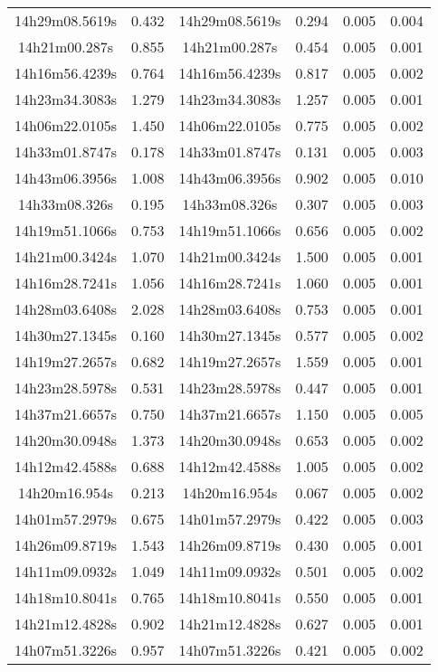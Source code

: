 \begin{table}
\begin{tabular}{cccccc}
14h29m08.5619s & 0.432 & 14h29m08.5619s & 0.294 & 0.005 & 0.004 \\
14h21m00.287s & 0.855 & 14h21m00.287s & 0.454 & 0.005 & 0.001 \\
14h16m56.4239s & 0.764 & 14h16m56.4239s & 0.817 & 0.005 & 0.002 \\
14h23m34.3083s & 1.279 & 14h23m34.3083s & 1.257 & 0.005 & 0.001 \\
14h06m22.0105s & 1.450 & 14h06m22.0105s & 0.775 & 0.005 & 0.002 \\
14h33m01.8747s & 0.178 & 14h33m01.8747s & 0.131 & 0.005 & 0.003 \\
14h43m06.3956s & 1.008 & 14h43m06.3956s & 0.902 & 0.005 & 0.010 \\
14h33m08.326s & 0.195 & 14h33m08.326s & 0.307 & 0.005 & 0.003 \\
14h19m51.1066s & 0.753 & 14h19m51.1066s & 0.656 & 0.005 & 0.002 \\
14h21m00.3424s & 1.070 & 14h21m00.3424s & 1.500 & 0.005 & 0.001 \\
14h16m28.7241s & 1.056 & 14h16m28.7241s & 1.060 & 0.005 & 0.001 \\
14h28m03.6408s & 2.028 & 14h28m03.6408s & 0.753 & 0.005 & 0.001 \\
14h30m27.1345s & 0.160 & 14h30m27.1345s & 0.577 & 0.005 & 0.002 \\
14h19m27.2657s & 0.682 & 14h19m27.2657s & 1.559 & 0.005 & 0.001 \\
14h23m28.5978s & 0.531 & 14h23m28.5978s & 0.447 & 0.005 & 0.001 \\
14h37m21.6657s & 0.750 & 14h37m21.6657s & 1.150 & 0.005 & 0.005 \\
14h20m30.0948s & 1.373 & 14h20m30.0948s & 0.653 & 0.005 & 0.002 \\
14h12m42.4588s & 0.688 & 14h12m42.4588s & 1.005 & 0.005 & 0.002 \\
14h20m16.954s & 0.213 & 14h20m16.954s & 0.067 & 0.005 & 0.002 \\
14h01m57.2979s & 0.675 & 14h01m57.2979s & 0.422 & 0.005 & 0.003 \\
14h26m09.8719s & 1.543 & 14h26m09.8719s & 0.430 & 0.005 & 0.001 \\
14h11m09.0932s & 1.049 & 14h11m09.0932s & 0.501 & 0.005 & 0.002 \\
14h18m10.8041s & 0.765 & 14h18m10.8041s & 0.550 & 0.005 & 0.001 \\
14h21m12.4828s & 0.902 & 14h21m12.4828s & 0.627 & 0.005 & 0.001 \\
14h07m51.3226s & 0.957 & 14h07m51.3226s & 0.421 & 0.005 & 0.002 \\

\end{tabular}
\end{table}
